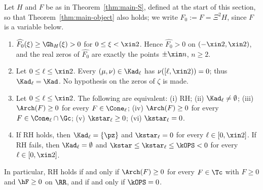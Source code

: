 \begin{corollary}\label{cor:nogap}
Let $H$ and $F$ be as in Theorem~\ref{thm:main-S}, defined at the start of this section, so that Theorem~\ref{thm:main-object} also holds;
we write $F_0:=F=\Xi^2H$, since $F$ is a variable below.
\begin{enumerate}[label=\textup{(\alph*)}]
\item $\widehat{F_0}(\xi)\ge\Gh_H(\xi)>0$ for $0\le\xi<\xin2$. Hence $\widehat{F_0}>0$ on $(-\xin2,\xin2)$, and the real zeros of $\widehat{F_0}$ are
exactly the points $\pm\xin n$, $n\ge2$.
\item Let $0\le \ell\le\xin2$. Every $(\mu,\nu)\in\Kad_\ell$ has $\nu([\ell,\xin2))=0$; thus $\Kad_\ell=\Kad$. No hypothesis on the zeros of $\zeta$ is made.
\item Let $0\le \ell\le\xin2$. The following are equivalent: \textup{(i)} RH; \textup{(ii)} $\Kad_\ell\ne\emptyset$; \textup{(iii)} $\Arch(F)\ge0$ for every
$F\in\Cone_\ell$; \textup{(iv)} $\Arch(F)\ge0$ for every $F\in\Cone_\ell\cap\Gc$; \textup{(v)} $\kstar_\ell\ge0$; \textup{(vi)} $\kstar_\ell=0$.
\item If RH holds, then $\Kad_\ell=\{\pz\}$ and $\kstar_\ell=0$ for every $\ell\in[0,\xin2]$. If RH fails, then $\Kad_\ell=\emptyset$ and
$\kstar\le\kstar_\ell\le\kOPS<0$ for every $\ell\in[0,\xin2]$.
\end{enumerate}
In particular, RH holds if and only if $\Arch(F)\ge0$ for every $F\in\Tc$ with $F\ge0$ and $\hF\ge0$ on $\RR$, and if and only if $\kOPS=0$.
\end{corollary}

